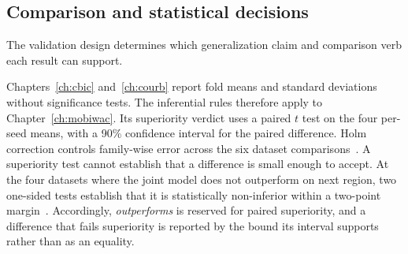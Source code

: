 \subsection{Comparison and statistical decisions}

The validation design determines which generalization claim and comparison verb each
result can support.

Chapters~\ref{ch:cbic} and~\ref{ch:courb} report fold means and standard deviations
without significance tests. The inferential rules therefore apply to
Chapter~\ref{ch:mobiwac}. Its superiority verdict uses a paired $t$ test on the four
per-seed means, with a 90\% confidence interval for the paired difference.
Holm
correction controls family-wise error across the six dataset
comparisons~\cite{holm1979}. A superiority test cannot establish that a difference is
small enough to accept. At the four datasets where the joint model does not outperform on next region, two one-sided tests
establish that it is statistically non-inferior within a two-point margin~\cite{lakens2017tost}. Accordingly, \emph{outperforms} is reserved for paired
superiority, and a difference that fails superiority is reported by the bound its interval
supports rather than as an equality.
